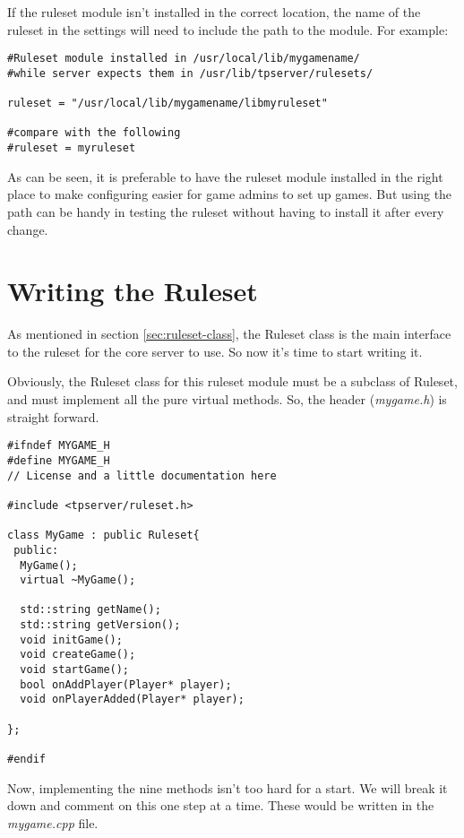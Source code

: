 \documentclass[a4paper,11pt]{report}
\newcommand{\filename}[1]{\emph{#1}}
\begin{document}
If the ruleset module isn't installed in the correct location, the name of the ruleset in the settings will need to include the path to the module. For example:

\begin{verbatim}
#Ruleset module installed in /usr/local/lib/mygamename/
#while server expects them in /usr/lib/tpserver/rulesets/

ruleset = "/usr/local/lib/mygamename/libmyruleset"

#compare with the following
#ruleset = myruleset
\end{verbatim}

As can be seen, it is preferable to have the ruleset module installed in the right place to make configuring easier for game admins to set up games. But using the path can be handy in testing the ruleset without having to install it after every change.

\chapter{Writing the Ruleset}
\label{chap:ruleset-writing}

As mentioned in section \ref{sec:ruleset-class}, the Ruleset class is the main interface to the ruleset for the core server to use. So now it's time to start writing it.

Obviously, the Ruleset class for this ruleset module must be a subclass of Ruleset, and must implement all the pure virtual methods. So, the header (\filename{mygame.h}) is straight forward.

\begin{verbatim}
#ifndef MYGAME_H
#define MYGAME_H
// License and a little documentation here

#include <tpserver/ruleset.h>

class MyGame : public Ruleset{
 public:
  MyGame();
  virtual ~MyGame();

  std::string getName();
  std::string getVersion();
  void initGame();
  void createGame();
  void startGame();
  bool onAddPlayer(Player* player);
  void onPlayerAdded(Player* player);

};

#endif
\end{verbatim}

Now, implementing the nine methods isn't too hard for a start. We will break it down and comment on this one step at a time. These would be written in the \filename{mygame.cpp} file.
\end{document}
